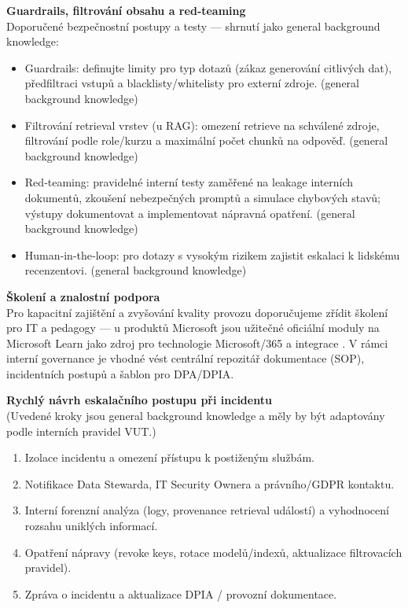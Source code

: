 \medskip

\textbf{Guardrails, filtrování obsahu a red‑teaming} \\
Doporučené bezpečnostní postupy a testy — shrnutí jako general background knowledge:
\begin{itemize}
  \item Guardrails: definujte limity pro typ dotazů (zákaz generování citlivých dat), předfiltraci vstupů a blacklisty/whitelisty pro externí zdroje. (general background knowledge)
  \item Filtrování retrieval vrstev (u RAG): omezení retrieve na schválené zdroje, filtrování podle role/kurzu a maximální počet chunků na odpověď. (general background knowledge)
  \item Red‑teaming: pravidelné interní testy zaměřené na leakage interních dokumentů, zkoušení nebezpečných promptů a simulace chybových stavů; výstupy dokumentovat a implementovat nápravná opatření. (general background knowledge)
  \item Human‑in‑the‑loop: pro dotazy s vysokým rizikem zajistit eskalaci k lidskému recenzentovi. (general background knowledge)
\end{itemize}

\medskip

\textbf{Školení a znalostní podpora} \\
Pro kapacitní zajištění a zvyšování kvality provozu doporučujeme zřídit školení pro IT a pedagogy — u produktů Microsoft jsou užitečné oficiální moduly na Microsoft Learn jako zdroj pro technologie Microsoft/365 a integrace \cite{kb_ai_101_tipu_pdf_04e4a115_page_54_1}. V rámci interní governance je vhodné vést centrální repozitář dokumentace (SOP), incidentních postupů a šablon pro DPA/DPIA.

\medskip

\textbf{Rychlý návrh eskalačního postupu při incidentu} \\
(Uvedené kroky jsou general background knowledge a měly by být adaptovány podle interních pravidel VUT.)
\begin{enumerate}
  \item Izolace incidentu a omezení přístupu k postiženým službám.
  \item Notifikace Data Stewarda, IT Security Ownera a právního/GDPR kontaktu.
  \item Interní forenzní analýza (logy, provenance retrieval událostí) a vyhodnocení rozsahu uniklých informací.
  \item Opatření nápravy (revoke keys, rotace modelů/indexů, aktualizace filtrovacích pravidel).
  \item Zpráva o incidentu a aktualizace DPIA / provozní dokumentace. 
\end{enumerate}

